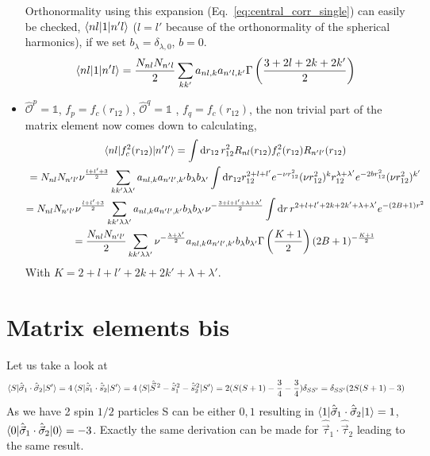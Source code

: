 \documentclass[10pt]{article}
\begin{document}
\begin{itemize}
	Orthonormality using this expansion (Eq.~\ref{eq:central_corr_single}) can easily be checked, $\braket{ n l |  1 | n' l}$ ($l=l'$ because of the orthonormality of the spherical harmonics), if we set $b_{\lambda} = \delta_{\lambda,0}$, $b=0$.
	\begin{align}
		\braket{ n l |  1 | n' l} =  \frac{N_{nl} N_{n'l}}{2}  \sum_{kk'} a_{nl,k} a_{n'l,k'} \Gamma \left( \frac{3+2l+2k + 2k'}{2} \right)
	\end{align}
	\item $\hat{\mathcal{O}}^{p} = \mathbb{1}$, $f_{p} = f_c(r_{12})$, $\hat{\mathcal{O}}^{q} = \mathbb{1}$ , $f_{q} = f_c(r_{12})$, the non trivial part of the matrix element now comes down to calculating,
	\begin{multline*}
		\braket{ n l |  f_{c}^{2}(r_{12}) | n' l'} = \int \text{d} r_{12} \, r_{12}^{2} R_{nl}(r_{12}) f_{c}^{2}(r_{12}) R_{n'l'}(r_{12}) \\
		= N_{nl} N_{n'l'} \nu^{\frac{l + l' + 3}{2}} \sum_{kk'\lambda \lambda'} a_{nl,k} a_{n'l',k'} b_{\lambda} b_{\lambda'}  \int \text{d} r_{12} r_{12}^{2+l+l'} e^{-\nu r_{12}^{2}} ( \nu r_{12}^{2} )^{k} r_{12}^{\lambda+\lambda'} e^{-2 b r_{12}^{2}} ( \nu r_{12}^{2})^{k'} \\
		= N_{nl} N_{n'l'} \nu^{\frac{l + l' + 3}{2}} \sum_{kk'\lambda \lambda'} a_{nl,k} a_{n'l',k'} b_{\lambda} b_{\lambda'} \nu^{- \frac{3 + l + l' + \lambda + \lambda'}{2}} \int \text{d} r \, r^{2+l+l'+2k+2k'+\lambda + \lambda'} e^{- ( 2B + 1) r^{2}} \\
		=  \frac{N_{nl} N_{n'l'}}{2} \sum_{kk'\lambda \lambda'} \nu^{ - \frac{\lambda + \lambda'}{2}} a_{nl,k} a_{n'l',k'} b_{\lambda} b_{\lambda'} \Gamma\left(\frac{K+1}{2}\right) (2B+1)^{-\frac{K+1}{2}}
	\end{multline*}
	With $K = 2+l+l'+2k+2k'+\lambda+\lambda'$.
\end{itemize}
\section{Matrix elements bis}

Let us take a look at
\begin{align*}
	\braket{ S | \hat{ \vec{\sigma}}_{1} \cdot \hat{ \vec{\sigma}}_{2} | S'} = 4 \braket{ S | \hat{ \vec{s}}_{1} \cdot \hat{ \vec{s}}_{2} | S'} = 4 \braket{ S | \hat{\vec{S}}^{\, 2} - \hat{\vec{s}}_{1}^{\,2} - \hat{\vec{s}}_{2}^{\,2} | S'} = 2 ( S(S+1) - \frac{3}{4} - \frac{3}{4} ) \delta_{SS'} = \delta_{SS'} (2 S(S+1) - 3)
\end{align*}
As we have 2 spin $1/2$ particles S can be either $0,1$ resulting in $\braket{ 1 | \hat{ \vec{\sigma}}_{1} \cdot \hat{ \vec{\sigma}}_{2} | 1} = 1$, $\braket{ 0 | \hat{ \vec{\sigma}}_{1} \cdot \hat{ \vec{\sigma}}_{2} | 0} = -3$.
Exactly the same derivation can be made for $\hat{\vec{\tau}}_{1} \cdot \hat{\vec{\tau}}_{2}$ leading to the same result.
\end{document}
